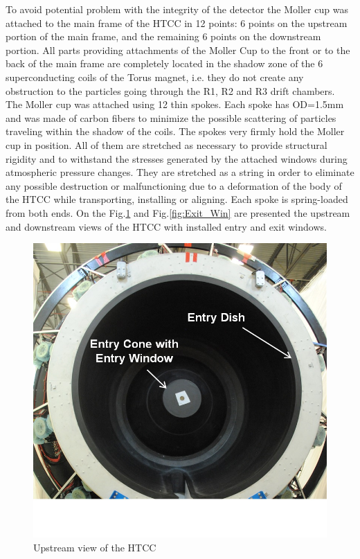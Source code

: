 To avoid potential problem with the integrity of the detector the Moller cup was attached to the main frame of the HTCC in 12 points: 6 points on the upstream portion of the main frame, and the remaining 6 points on the downstream portion. All parts providing attachments of the Moller Cup to the front or to the back of the main frame are completely located in the shadow zone of the 6 superconducting coils of the Torus magnet, i.e. they do not create any obstruction to the particles going through the R1, R2 and R3 drift chambers. The Moller cup was attached using 12 thin spokes. Each spoke has OD=1.5mm and was made of carbon fibers to minimize the possible scattering of particles traveling within the shadow of the coils. The spokes very firmly hold the Moller cup in position. All of them are stretched as necessary to provide structural rigidity and to withstand the stresses generated by the attached windows during atmospheric pressure changes. They are stretched as a string in order to eliminate any possible destruction or malfunctioning due to a deformation of the body of the HTCC while transporting, installing or aligning. Each spoke is spring-loaded from both ends. On the Fig.\ref{fig:Front_View} and Fig.\ref{fig:Exit_Win} are presented the upstream and downstream views of the HTCC with installed entry and exit windows.

\begin{figure}[ht]
    \centering
    \includegraphics[width=1.0\linewidth,trim={0 2.5cm 0 0},clip]{images/Front_View}
    \caption{Upstream view of the HTCC}
    \label{fig:Front_View}
\end{figure}



